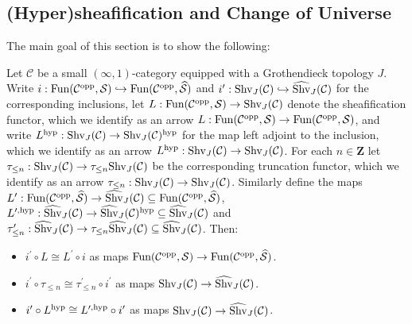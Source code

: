 \documentclass[10pt]{article}
\newcommand{\mS}{\mathcal S}
\newcommand{\C}{\mathcal C}
\newcommand{\ZZ}{\mathbb{Z}}
\def\ZZ{{\mathbf Z}}
\theoremstyle{witharg}
\theoremstyle{witharg}
\theoremstyle{witharg2}
\begin{document}
\subsection{(Hyper)sheafification and Change of Universe}\label{(Hyper)sheafification and Change of Universe}


The main goal of this section is to show the following: 



\begin{proposition}{}\label{HyperSheafification Ind of Choice of Universe}

Let $\C$ be a small $(\infty,1)$-category equipped with a Grothendieck topology $J$. Write $i:\textnormal{Fun}(\C^{\textnormal{opp}},\mS)\hookrightarrow \textnormal{Fun}(\C^{\textnormal{opp}},\widehat{\mS})$ and  $i^\prime:\textnormal{Shv}_J(\C)\hookrightarrow \widehat{\textnormal{Shv}}_J(\C)$ for the corresponding inclusions, let $L:\textnormal{Fun}(\C^{\textnormal{opp}},\mS)\rightarrow \textnormal{Shv}_J(\C)$ denote the sheafification functor, which we identify as an arrow $L:\textnormal{Fun}(\C^{\textnormal{opp}},\mS)\rightarrow \textnormal{Fun}(\C^{\textnormal{opp}},\mS)$, and write $L^{\textnormal{hyp}}:\textnormal{Shv}_J(\C)\rightarrow \textnormal{Shv}_J(\C)^{\textnormal{hyp}}$ for the map left adjoint to the inclusion, which we identify as an arrow $L^{\textnormal{hyp}}:\textnormal{Shv}_J(\C)\rightarrow \textnormal{Shv}_J(\C)$. For each $n\in \ZZ$ let $\tau_{\leq n}:\textnormal{Shv}_J(\C)\rightarrow\tau_{\leq n}\textnormal{Shv}_J(\C)$ be the corresponding truncation functor, which we identify as an arrow $\tau_{\leq n}:\textnormal{Shv}_J(\C)\rightarrow \textnormal{Shv}_J(\C)$. Similarly define the maps $L^\prime:\textnormal{Fun}(\C^{\textnormal{opp}},\widehat{\mS})\rightarrow \widehat{\textnormal{Shv}}_J(\C)\subseteq \textnormal{Fun}(\C^{\textnormal{opp}},\widehat{\mS})$, $L^{\prime,\textnormal{hyp}}:\widehat{\textnormal{Shv}}_J(\C)\rightarrow\widehat{\textnormal{Shv}}_J(\C)^\textnormal{hyp}\subseteq \widehat{\textnormal{Shv}}_J(\C)$ and $\tau^\prime_{\leq n}:\widehat{\textnormal{Shv}}_J(\C)\rightarrow \tau_{\leq n}\widehat{\textnormal{Shv}}_J(\C)\subseteq \widehat{\textnormal{Shv}}_J(\C)$. Then: 

    \begin{itemize}
    
        \item [$(1)$] $i^\prime \circ L\cong L^\prime\circ i$ as maps $\textnormal{Fun}(\C^{\textnormal{opp}},\mS)\rightarrow \textnormal{Fun}(\C^{\textnormal{opp}},\widehat{\mS})$.

        \item [$(2)$] $i^\prime\circ \tau_{\leq n} \cong \tau^\prime_{\leq n}\circ i^\prime$ as maps $\textnormal{Shv}_J(\C)\rightarrow \widehat{\textnormal{Shv}}_J(\C)$. 

        \item [$(3)$] $i^\prime\circ L^{\textnormal{hyp}}\cong L^{\prime,\textnormal{hyp}}\circ i^\prime$ as maps $\textnormal{Shv}_J(\C)\rightarrow\widehat{\textnormal{Shv}}_J(\C)$.
        
    \end{itemize}

    
\end{proposition}
\end{document}

